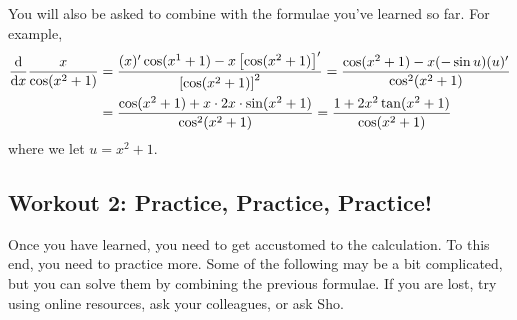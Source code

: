 \documentclass[11pt,pdfa,lastpage]{MishoNote}
\newif\ifBasicForm\BasicFormtrue
\begin{document}
\begin{problems}
\end{problems}

You will also be asked to combine with the formulae you've learned so far. For example,
  \begin{align*}
  \diff{}{x}\frac{x}{\cos(x^2+1)}
  &= \frac{(x)'\cos(x^1+1)-x\left[\cos(x^2+1)\right]'}{\left[\cos(x^2+1)\right]^2}
  = \frac{\cos(x^2+1)-x(-\sin u)(u)'}{\cos^2(x^2+1)}
  \\&= \frac{\cos(x^2+1)+x\cdot 2x\cdot \sin (x^2+1)}{\cos^2(x^2+1)} = \frac{1+2x^2\tan(x^2+1)}{\cos(x^2+1)}
  \end{align*}
where we let $u=x^2+1$.

\ifBasicForm\pagebreak\fi

\subsection{Workout 2: Practice, Practice, Practice!}
Once you have learned, you need to get accustomed to the calculation. To this end, you need to practice more.
Some of the following may be a bit complicated, but you can solve them by combining the previous formulae.
If you are lost, try using online resources, ask your colleagues, or ask Sho.
\end{document}

